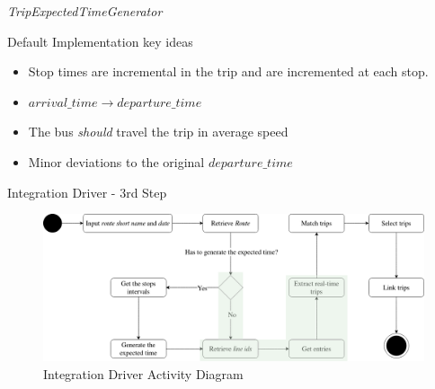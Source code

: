 \documentclass[xcolor=dvipsnames,table]{beamer}
\begin{document}
\begin{frame}{\textit{TripExpectedTimeGenerator}}
        \begin{block}{Default Implementation key ideas}
                \begin{itemize}
                        \item Stop times are incremental in the trip
                                and are incremented at each stop.
                        \item $arrival\_time \rightarrow departure\_time$
                        \item The bus {\em should} travel the trip in average speed
                        \item Minor deviations to the original $departure\_time$
                \end{itemize}
        \end{block}
\end{frame}

\begin{frame}{Integration Driver - 3rd Step}
        \begin{figure}[H]
                \centering
                \includegraphics[width = \textwidth]{images/integrationDriverAD(3rd_step).png}
                \caption{Integration Driver Activity Diagram}
        \end{figure}
\end{frame}
\end{document}
